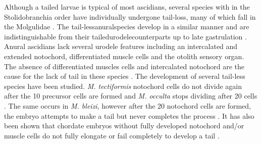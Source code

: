 Although a tailed larvae is typical of most ascidians, several species with in the Stolidobranchia order have individually undergone tail-loss, many of which fall in the Molgulidae \cite{berrill_studies_1931, jeffery_evolution_1999, huber_evolution_2000, maliska_molgula_2010}. The tail-less\textemdash anural\textemdash species develop in a similar manner and are indistinguishable from their tailed\textemdash urodele\textemdash counterparts up to late gastrulation \cite{berrill_studies_1931, swalla_interspecific_1990, jeffery_factors_1992}. Anural ascidians lack several urodele features including an intercalated and extended notochord, differentiated muscle cells and the otolith sensory organ. The absence of differentiated muscles cells and intercalated notochord are the cause for the lack of tail in these species \cite{miyamoto_formation_1985, swalla_interspecific_1990}. The development of several tail-less species have been studied. \textit{M. tectiformis} notochord cells do not divide again after the 10 precursor cells are formed and \textit{M. occulta} stops dividing after 20 cells \cite{jeffery_evolution_1999}. The same occurs in \textit{M. bleizi}, however after the 20 notochord cells are formed, the embryo attempts to make a tail but never completes the process \cite{swalla_novel_1993}. It has also been shown that chordate embryos without fully developed notochord and/or muscle cells do not fully elongate or fail completely to develop a tail \cite{jeffery_evolution_1999,takada_brachyury_2002,stemple_structure_2005}. 

